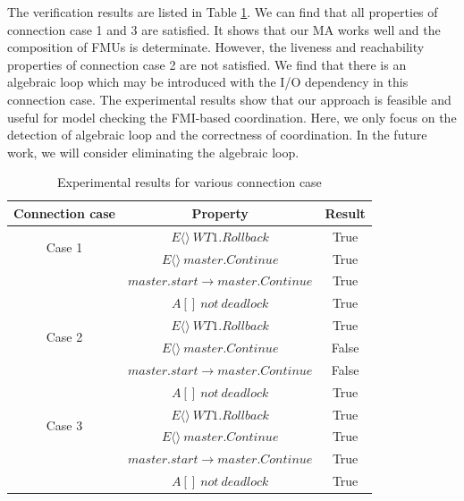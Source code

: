 The verification results are listed in Table \ref{rs}. We can find that all properties of connection case 1 and 3 are satisfied. It shows that our MA works well and the composition of FMUs is determinate. However, the liveness and reachability properties of connection case 2 are not satisfied. We find that there is an algebraic loop which may be introduced with the I/O dependency in this connection case. The experimental results show that our approach is feasible and useful for model checking the FMI-based coordination.
Here, we only focus on the detection of algebraic loop and the correctness of coordination. In the future work, we will consider eliminating the algebraic loop.  
\begin{table}
\caption{Experimental results for various connection case}
\centering
\begin{tabular}{c c c} 
        \hline  
        Connection case & Property & Result\\
        \hline
        \multirow{2}{2.0cm}{Case 1}  
                & $E\langle\rangle~WT1.Rollback$ & True\\ 
                & $E\langle\rangle~master.Continue$ & True\\ 
                & $master.start\rightarrow master.Continue$ & True\\ 
                & $A[]~not~deadlock$ & True\\   
        \hline 
        \multirow{2}{2.0cm}{Case 2}  
                & $E\langle\rangle~WT1.Rollback$ & True\\ 
                & $E\langle\rangle~master.Continue$ & False\\ 
                & $master.start\rightarrow master.Continue$ & False\\ 
                & $A[]~not~deadlock$ & True\\   
        \hline 
        \multirow{2}{2.0cm}{Case 3}  
                & $E\langle\rangle~WT1.Rollback$ & True\\ 
                & $E\langle\rangle~master.Continue$ & True\\ 
                & $master.start \rightarrow master.Continue$ & True\\ 
                & $A[]~not~deadlock$ & True\\   
        \hline 
\end{tabular} 
\label{rs}
\end{table}




